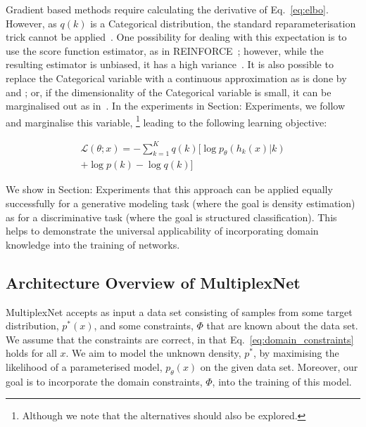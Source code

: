 \documentclass[letterpaper]{article} %
\begin{document}
Gradient based methods require calculating the derivative of Eq.~\ref{eq:elbo}.
However, as $q(k)$ is a Categorical distribution, the standard reparameterisation trick cannot be applied~\citep{kingma2013auto}.
One possibility for dealing with this expectation is to use the score function estimator, as in REINFORCE~\citep{williams1992simple}; however, while the resulting estimator is unbiased, it has a high variance~\citep{mnih2014neural}.
It is also possible to replace the Categorical variable with a continuous approximation as is done by \citet{maddison2016concrete} and \citet{jang2016categorical}; or, if the dimensionality of the Categorical variable is small, it can be marginalised out as in~\cite{kingma2014semi}.
In the experiments in Section: Experiments, we follow \citet{kingma2014semi} and marginalise this variable,%
    \footnote{Although we note that the alternatives should also be explored.}
leading to the following learning objective:

\begin{multline}
    \label{eq:learning_objective}
    \mathcal{L}(\theta; x) = -\sum\limits_{k=1}^{K} q(k)\big[ \log p_\theta(h_k(x) | k) \\ + \log p(k) - \log q(k) \big]
\end{multline}

We show in Section: Experiments that this approach can be applied equally successfully for a generative modeling task (where the goal is density estimation) as for a discriminative task (where the goal is structured classification).
This helps to demonstrate the universal applicability of incorporating domain knowledge into the training of networks.

\subsection{Architecture Overview of MultiplexNet}
\label{appendix:architecture_overview}

MultiplexNet accepts as input a data set consisting of samples from some target distribution, $p^*(x)$, and some constraints, $\Phi$ that are known about the data set. 
We assume that the constraints are correct, in that Eq.~\ref{eq:domain_constraints} holds for all $x$.
We aim to model the unknown density, $p^*$, by maximising the likelihood of a parameterised model, $p_\theta(x)$ on the given data set.
Moreover, our goal is to incorporate the domain constraints, $\Phi$, into the training of this model.
\end{document}
